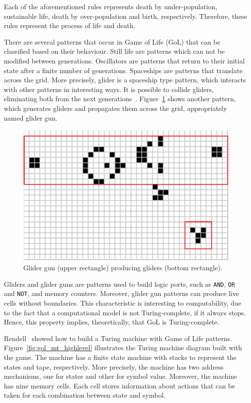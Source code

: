 \documentclass[12pt]{article}
\begin{document}
Each of the aforementioned rules represents death by under-population,
sustainable life, death by over-population and birth, respectively. Therefore,
these rules represent the process of life and death.

There are several patterns that occur in Game of Life (GoL) that can be
classified based on their behaviour. Still life are patterns which can not be
modified between generations. Oscillators are patterns that return to their
initial state after a finite number of generations. Spaceships are patterns
that translate across the grid. More precisely, glider is a spaceship type
pattern, which interacts with other patterns in interesting ways. It is
possible to collide gliders, eliminating both from the next
generations~\cite{Adamatzky:book:2012}. Figure~\ref{fig:glider_gun} shows
another pattern, which generates gliders and propagates them across the grid,
appropriately named glider gun.

\begin{figure}[h]
    \centering
    \includegraphics[scale=0.9]{images/glider-gun.pdf}
    \caption{Glider gun (upper rectangle) producing gliders (bottom
        rectangle).}
    \label{fig:glider_gun}
\end{figure}

Gliders and glider guns are patterns used to build logic ports, such as
\texttt{AND}, \texttt{OR} and \texttt{NOT}, and memory counters. Moreover,
glider gun patterns can produce live cells without boundaries. This
characteristic is interesting to computability, due to the fact that a
computational model is not Turing-complete, if it always stops. Hence, this
property implies, theoretically, that GoL is Turing-complete.

Rendell~\cite{Rendell:inproc:2011:jul, Rendell:phd:2014:jan} showed how to
build a Turing machine with Game of Life patterns.
Figure~\ref{fig:gol_mt_highlevel} illustrates the Turing machine diagram built
with the game. The machine has a finite state machine with stacks to represent
the states and tape, respectively. More precisely, the machine has two address
mechanisms, one for states and other for symbol value. Moreover, the machine
has nine memory cells. Each cell stores information about actions that can be
taken for each combination between state and symbol.
\end{document}
